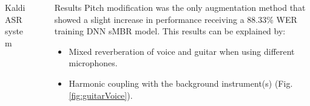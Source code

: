 \documentclass[final]{beamer}
\newlength{\sepwid}
\newlength{\onecolwid}
\newlength{\twocolwid}
\begin{document}
\begin{frame}[t]
\begin{columns}[t]
\begin{column}{\twocolwid}




  
\begin{block}{Kaldi ASR system}
    \centering
     
     
 \end{block}       
       
    
        
        


\end{column} %

\begin{column}{\sepwid}\end{column} %

\begin{column}{\onecolwid} %




\begin{block}{Results}
Pitch modification was the only augmentation method that showed a slight increase in performance receiving a 88.33\% WER training DNN sMBR model.
This results can be explained by:
    \begin{itemize}
        \item Mixed reverberation of voice and guitar when using different microphones. 
        \item Harmonic coupling with the background instrument(s) (Fig. \ref{fig:guitarVoice}).
    \end{itemize}
    

\end{block}
\end{column}
\end{columns}
\end{frame}
\end{document}

